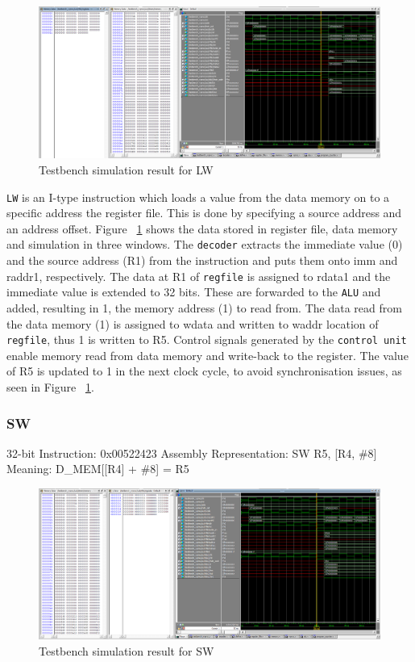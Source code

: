 \begin{figure}[h!]
\centering
\includegraphics[width=12cm]{figures/RISCV_Implementation_LW.PNG}
\caption{Testbench simulation result for LW}
\label{fig:riscv10}
\end{figure}

\verb|LW| is an I-type instruction which loads a value from the data memory on to a specific address the register file. This is done by specifying a source address and an address offset. Figure ~\ref{fig:riscv10} shows the data stored in register file, data memory and simulation in three windows.  The \verb|decoder| extracts the immediate value (0) and the source address (R1) from the instruction and puts them onto imm and raddr1, respectively. The data at R1 of \verb|regfile| is assigned to rdata1 and the immediate value is extended to 32 bits. These are forwarded to the \verb|ALU| and added, resulting in 1, the memory address (1) to read from. The data read from the data memory (1) is assigned to wdata and written to waddr location of \verb|regfile|, thus 1 is written to R5. Control signals generated by the \verb|control unit| enable memory read from data memory and write-back to the register. The value of R5 is updated to 1 in the next clock cycle, to avoid synchronisation issues, as seen in Figure ~\ref{fig:riscv10}.

\subsubsection*{SW}
\label{sect6_4_3_2d}

32-bit Instruction: 0x00522423 \newline
Assembly Representation: SW R5, [R4, \#8] \newline
Meaning: D\_MEM[[R4] + \#8] = R5

\begin{figure}[h!]
\centering
\includegraphics[width=12cm]{figures/RISCV_Implementation_SW.PNG}
\caption{Testbench simulation result for SW}
\label{fig:riscv11}
\end{figure}

